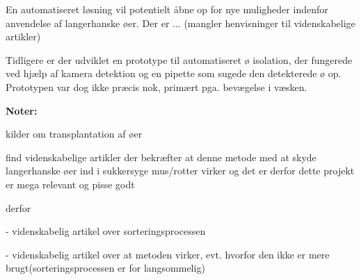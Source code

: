 En automatiseret løsning vil potentielt åbne op for nye muligheder indenfor anvendelse af langerhanske øer. Der er ... (mangler henvisninger til videnskabelige artikler)

Tidligere er der udviklet en prototype til automatiseret ø isolation, der fungerede ved hjælp af kamera detektion og en pipette som sugede den detekterede ø op. Prototypen var dog ikke præcis nok, primært pga. bevægelse i væsken. 
 

\textbf{Noter:}

kilder om transplantation af øer


 
 
 find videnskabelige artikler der bekræfter at denne metode med at skyde langerhanske øer ind i sukkersyge mus/rotter virker og det er derfor dette projekt er mega relevant og pisse godt
 
 derfor
 
 - videnskabelig artikel over sorteringsprocessen
 
 - videnskabelig artikel over at metoden virker, evt. hvorfor den ikke er mere brugt(sorteringsprocessen er for langsommelig)

